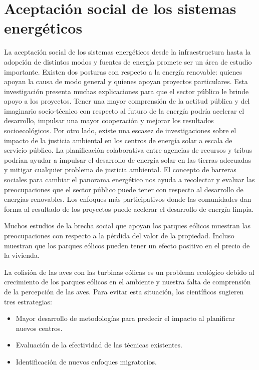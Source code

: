 \documentclass{article}
\begin{document}
\section{Aceptación social de los sistemas energéticos}


La aceptación social de los sistemas energéticos desde la infraestructura hasta la adopción de distintos modos y fuentes de energía promete ser un área de estudio importante. Existen dos posturas con respecto a la energía renovable: quienes apoyan la causa de modo general y quienes apoyan proyectos particulares. Esta investigación presenta muchas explicaciones para que el sector público le brinde apoyo a los proyectos. Tener una mayor comprensión de la actitud pública y del imaginario socio-técnico con respecto al futuro de la energía podría acelerar el desarrollo, impulsar una mayor cooperación y mejorar los resultados socioecológicos. Por otro lado, existe una escasez de investigaciones sobre el impacto de la justicia ambiental en los centros de energía solar a escala de servicio público. La planificación colaborativa entre agencias de recursos y tribus podrían ayudar a impulsar el desarrollo de energía solar en las tierras adecuadas y mitigar cualquier problema de justicia ambiental. El concepto de barreras sociales para cambiar el panorama energético nos ayuda a recolectar y evaluar las preocupaciones que el sector público puede tener con respecto al desarrollo de energías renovables. Los enfoques más participativos donde las comunidades dan forma al resultado de los proyectos puede acelerar el desarrollo de energía limpia.


Muchos estudios de la brecha social que apoyan los parques eólicos muestran las preocupaciones con respecto a la pérdida del valor de la propiedad. Incluso muestran que los parques eólicos pueden tener un efecto positivo en el precio de la vivienda.


La colisión de las aves con las turbinas eólicas es un problema ecológico debido al crecimiento de los parques eólicos en el ambiente y nuestra falta de comprensión de la percepción de las aves. Para evitar esta situación, los científicos sugieren tres estrategias: 
\begin{itemize}
    \item Mayor desarrollo de metodologías para predecir el impacto al planificar nuevos centros.
    \item Evaluación de la efectividad de las técnicas existentes.
    \item Identificación de nuevos enfoques migratorios. 
\end{itemize}
\end{document}
